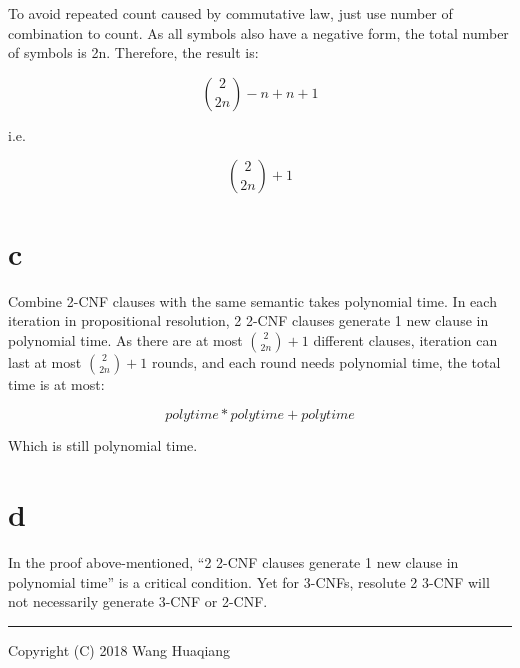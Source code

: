 To avoid repeated count caused by commutative law, just use number of
combination to count. As all symbols also have a negative form, the
total number of symbols is 2n. Therefore, the result is:

\[\binom{2}{2n} - n + n + 1\]

i.e.

\[\binom{2}{2n} + 1\]

\hypertarget{c}{%
\section{c}\label{c}}

Combine 2-CNF clauses with the same semantic takes polynomial time. In
each iteration in propositional resolution, 2 2-CNF clauses generate 1
new clause in polynomial time. As there are at most
\(\binom{2}{2n} + 1\) different clauses, iteration can last at most
\(\binom{2}{2n} + 1\) rounds, and each round needs polynomial time, the
total time is at most:

\[polytime*polytime+polytime\]

Which is still polynomial time.

\hypertarget{d}{%
\section{d}\label{d}}

In the proof above-mentioned, ``2 2-CNF clauses generate 1 new clause in
polynomial time'' is a critical condition. Yet for 3-CNFs, resolute 2
3-CNF will not necessarily generate 3-CNF or 2-CNF.

\begin{center}\rule{0.5\linewidth}{\linethickness}\end{center}

Copyright (C) 2018 Wang Huaqiang

